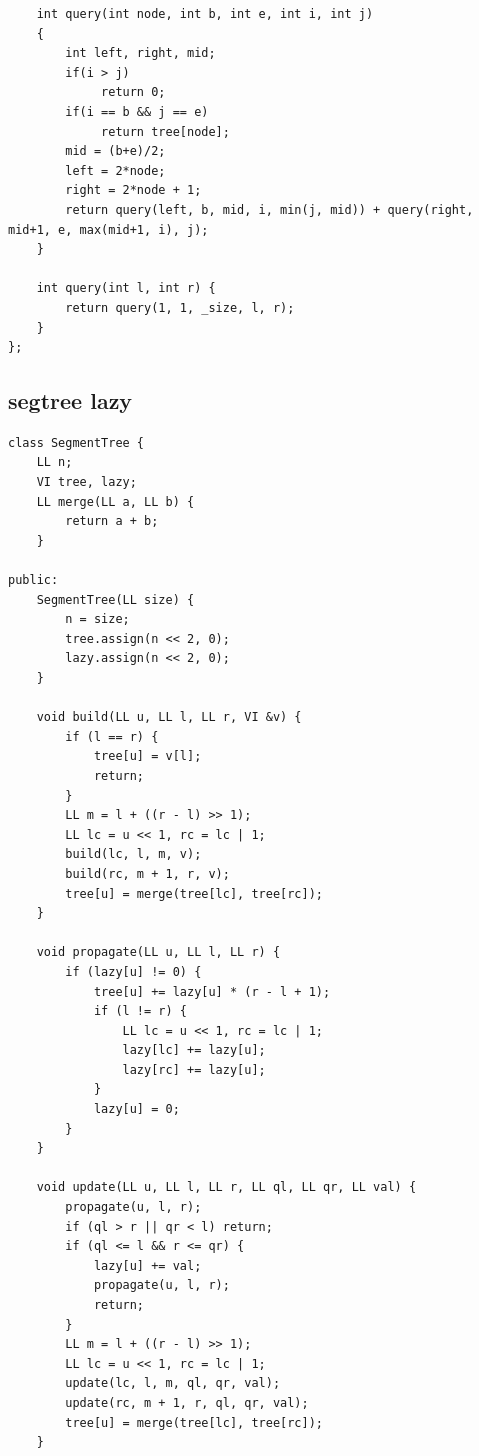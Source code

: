 \documentclass[twoside]{article}
\begin{document}
\begin{multicols*}{3}
\begin{verbatim}
    int query(int node, int b, int e, int i, int j)
    {
        int left, right, mid;
        if(i > j)
             return 0;
        if(i == b && j == e)
             return tree[node];
        mid = (b+e)/2;
        left = 2*node;
        right = 2*node + 1;
        return query(left, b, mid, i, min(j, mid)) + query(right, mid+1, e, max(mid+1, i), j);
    }

    int query(int l, int r) {
        return query(1, 1, _size, l, r);
    }
};

\end{verbatim}

{
\subsection*{segtree lazy}
}
\begin{verbatim}
class SegmentTree {
    LL n;
    VI tree, lazy;
    LL merge(LL a, LL b) {
        return a + b;
    }

public:
    SegmentTree(LL size) {
        n = size;
        tree.assign(n << 2, 0);
        lazy.assign(n << 2, 0);
    }

    void build(LL u, LL l, LL r, VI &v) {
        if (l == r) {
            tree[u] = v[l];
            return;
        }
        LL m = l + ((r - l) >> 1);
        LL lc = u << 1, rc = lc | 1;
        build(lc, l, m, v);
        build(rc, m + 1, r, v);
        tree[u] = merge(tree[lc], tree[rc]);
    }

    void propagate(LL u, LL l, LL r) {
        if (lazy[u] != 0) {
            tree[u] += lazy[u] * (r - l + 1);
            if (l != r) {
                LL lc = u << 1, rc = lc | 1;
                lazy[lc] += lazy[u];
                lazy[rc] += lazy[u];
            }
            lazy[u] = 0;
        }
    }

    void update(LL u, LL l, LL r, LL ql, LL qr, LL val) {
        propagate(u, l, r);
        if (ql > r || qr < l) return;
        if (ql <= l && r <= qr) {
            lazy[u] += val;
            propagate(u, l, r);
            return;
        }
        LL m = l + ((r - l) >> 1);
        LL lc = u << 1, rc = lc | 1;
        update(lc, l, m, ql, qr, val);
        update(rc, m + 1, r, ql, qr, val);
        tree[u] = merge(tree[lc], tree[rc]);
    }


\end{verbatim}
\end{multicols*}
\end{document}

